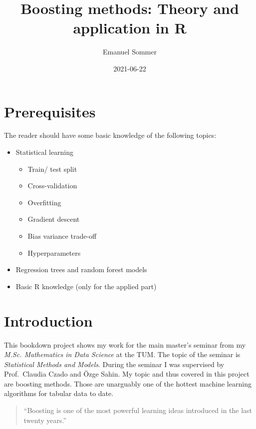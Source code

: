 \documentclass[
]{book}
\title{Boosting methods: Theory and application in R}
\author{Emanuel Sommer}
\date{2021-06-22}
\begin{document}
\maketitle

{
\setcounter{tocdepth}{1}
\tableofcontents
}
\hypertarget{prerequisites}{%
\chapter{Prerequisites}\label{prerequisites}}

The reader should have some basic knowledge of the following topics:

\begin{itemize}
\item
  Statistical learning

  \begin{itemize}
  \item
    Train/ test split
  \item
    Cross-validation
  \item
    Overfitting
  \item
    Gradient descent
  \item
    Bias variance trade-off
  \item
    Hyperparameters
  \end{itemize}
\item
  Regression trees and random forest models
\item
  Basic R knowledge (only for the applied part)
\end{itemize}

\hypertarget{intro}{%
\chapter{Introduction}\label{intro}}

This bookdown project shows my work for the main master's seminar from my \emph{M.Sc. Mathematics in Data Science} at the TUM. The topic of the seminar is \emph{Statistical Methods and Models}. During the seminar I was supervised by Prof.~Claudia Czado and Özge Sahin. My topic and thus covered in this project are boosting methods. Those are unarguably one of the hottest machine learning algorithms for tabular data to date.

\begin{quote}
``Boosting is one of the most powerful learning ideas introduced in the last
twenty years.'' \citep{elements}
\end{quote}
\end{document}
